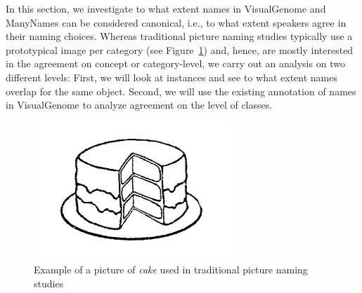 %

In this section, we investigate to what extent names in VisualGenome and ManyNames can be considered canonical, i.e., to what extent speakers agree in their naming choices.
Whereas traditional picture naming studies typically use a prototypical image per category (see Figure~\ref{fig:picture_naming}) and, hence, are mostly interested in the agreement on concept or category-level, we carry out an analysis on two different levels: First, we will look at instances and see to what extent names overlap for the same object. 
Second, we will use the existing annotation of names in VisualGenome to analyze agreement on the level of classes.
\begin{figure}[t]
	\centering
	\includegraphics[scale=.5]{figures/snodgrass_vanderwart_cake_042.png}
	\caption{Example of a picture of \textsl{cake} used in traditional picture naming studies \cite{snodgrass} \label{fig:picture_naming}}
\end{figure}

